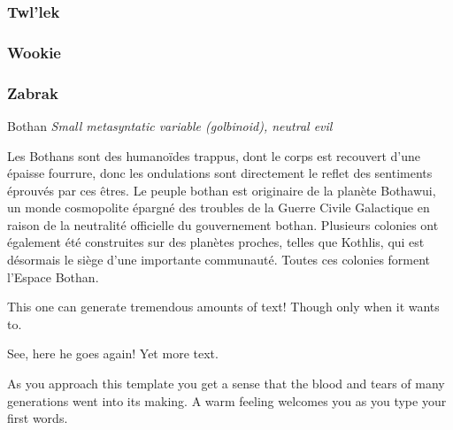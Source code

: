 \subsubsection{Twl'lek}
\subsubsection{Wookie}
\subsubsection{Zabrak}

\newpage
\begin{monsterbox}{Bothan}
	\textit{Small metasyntatic variable (golbinoid), neutral evil}\\
	\hline
	\basics[%
	type = Félin,
	planet = Bothawui,
	language = Bothese
	]
	\hline
	\traits[
    AGI = \stat{8} %
	]
	\stats[
    RES = 0 %
	]

	\hline
	
	\details[%
	size = 1m50
	]
	\hline 
	Les Bothans sont des humanoïdes trappus, dont le corps est recouvert d'une épaisse fourrure, donc les ondulations sont directement le reflet des sentiments éprouvés par ces êtres. 
  	Le peuple bothan est originaire de la planète Bothawui, un monde cosmopolite épargné des troubles de la Guerre Civile Galactique en raison de la neutralité officielle du gouvernement bothan. Plusieurs colonies ont également été construites sur des planètes proches, telles que Kothlis, qui est désormais le siège d'une importante communauté. Toutes ces colonies forment l'Espace Bothan. 
	\begin{monsteraction}
		This one can generate tremendous amounts of text! Though only when it wants to.
	\end{monsteraction}

	\begin{monsteraction}
    See, here he goes again! Yet more text.
	\end{monsteraction}
\end{monsterbox}

\begin{quotebox}
	As you approach this template you get a sense that the blood and tears of many generations went into its making. A warm feeling welcomes you as you type your first words.
\end{quotebox}

